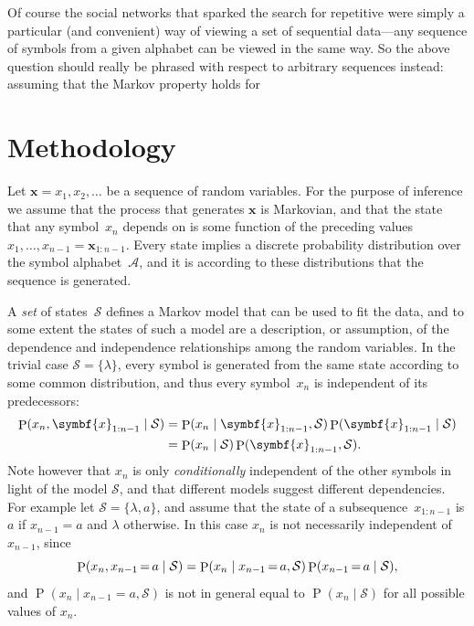 \documentclass[12pt,a4paper]{article}
\newcommand\mc[1]{\mathcal{#1}}               %
\newcommand\ub[1]{\symbf{#1}}                 %
\DeclareMathOperator\Pb{P}                    %
\DeclarePairedDelimiter\lr{\lparen}{\rparen}  %
\newcommand\peq{\mathop{=}}   %
\begin{document}
Of course the social networks that sparked the search for repetitive were simply
a particular (and convenient) way of viewing a set of sequential data---any
sequence of symbols from a given alphabet can be viewed in the same way. So the
above question should really be phrased with respect to arbitrary sequences
instead: assuming that the Markov property holds for 

\section{Methodology} %

Let \(\ub{x} = x_1, x_2, \dotsc\) be a sequence of random variables. For the
purpose of inference we assume that the process that generates \(\ub{x}\) is
Markovian, and that the state that any symbol~\(x_n\) depends on is some
function of the preceding values~\(x_1, \dots, x_{n-1} = \ub{x}_{1:n-1}\). Every
state implies a discrete probability distribution over the symbol
alphabet~\(\mc{A}\), and it is according to these distributions that the
sequence is generated.


A \emph{set} of states~\(\mc{S}\) defines a Markov model that can be used to fit
the data, and to some extent the states of such a model are a description, or
assumption, of the dependence and independence relationships among the random
variables. In the trivial case \(\mc{S} = \{\lambda\}\), every symbol is
generated from the same state according to some common distribution, and thus
every symbol~\(x_n\) is independent of its predecessors: 
\begin{align*}
  \Pb\lr{x_n, \ub{x}_{1:n-1} \mid \mc{S}} &=
    \Pb\lr{x_n \mid \ub{x}_{1:n-1}, \mc{S}}
    \Pb\lr{\ub{x}_{1:n-1} \mid \mc{S}} \\
  &= \Pb\lr{x_n \mid \mc{S}} \Pb\lr{\ub{x}_{1:n-1}, \mc{S}}.
\end{align*}
Note however that \(x_n\) is only \emph{conditionally} independent of the other
symbols in light of the model \(\mc{S}\), and that different models suggest
different dependencies. For example let \(\mc{S} = \{\lambda, a\}\), and assume
that the state of a subsequence~\(x_{1:n-1}\) is \(a\) if \(x_{n-1} = a\) and
\(\lambda\) otherwise. In this case \(x_n\) is not necessarily independent of
\(x_{n-1}\), since
\begin{equation*}
  \Pb\lr{x_n, x_{n-1} \peq a \mid \mc{S}} =
    \Pb\lr{x_n \mid x_{n-1} \peq a, \mc{S}} \Pb\lr{x_{n-1} \peq a \mid \mc{S}},
\end{equation*}
and \({\Pb(x_n \mid x_{n-1} \peq a, \mc{S})}\) is not in general equal to
\(\Pb(x_n \mid \mc{S})\) for all possible values of \(x_n\).
\end{document}
